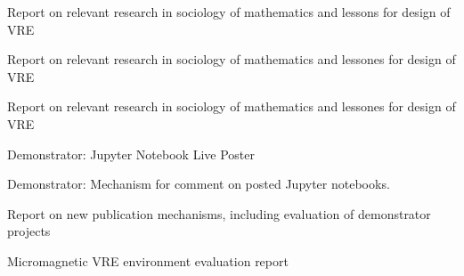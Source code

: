 \begin{workpackage}[id=social-aspects,wphases=0-48,
  title=Social Aspects,
  lead=UO,
  UORM=27,USHRM=8, USORM=6]
\begin{wpdelivs}
\begin{wpdeliv}[due=3,id=social-report,dissem=PU,nature=R,lead=UO]
 {Report on relevant research in sociology of mathematics and lessons
   for design of \TheProject VRE}
\end{wpdeliv}
\begin{wpdeliv}[due=24,id=social-report-two,dissem=PU,nature=R,lead=UO]
 {Report on relevant research in sociology of mathematics and lessones
   for design of \TheProject VRE}
\end{wpdeliv}
\begin{wpdeliv}[due=42,id=social-report-three,dissem=PU,nature=R,lead=UO]
 {Report on relevant research in sociology of mathematics and lessones
   for design of \TheProject VRE}
\end{wpdeliv}

 \begin{wpdeliv}[due=36,id=social-poster,dissem=PU,nature=DEM,lead=USH]
   {Demonstrator: Jupyter Notebook Live Poster} 
\end{wpdeliv}
 \begin{wpdeliv}[due=24,id=social-poster,dissem=PU,nature=DEM,lead=USH]
   {Demonstrator: Mechanism for comment on posted Jupyter notebooks.} 
\end{wpdeliv}
\begin{wpdeliv}[due=42,id=social-publishing-report,dissem=PU,nature=R,lead=USH]
{Report on new publication mechanisms, including evaluation of
  demonstrator projects}
\end{wpdeliv}


 \begin{wpdeliv}[due=48,id=oommf-nb-evaluation,dissem=PU,nature=R,lead=USO]
      {Micromagnetic VRE environment evaluation report}
\end{wpdeliv}
\end{wpdelivs}
\end{workpackage}

